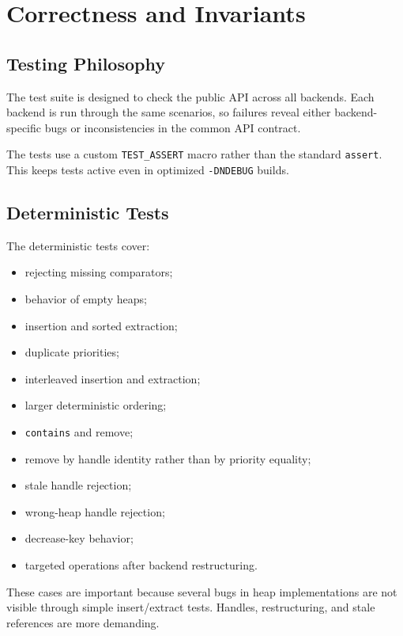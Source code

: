 \chapter{Correctness and Invariants}

\section{Testing Philosophy}

The test suite is designed to check the public API across all backends.
Each backend is run through the same scenarios, so failures reveal either backend-specific bugs or inconsistencies in the common API contract.

The tests use a custom \texttt{TEST\_ASSERT} macro rather than the standard \texttt{assert}.
This keeps tests active even in optimized \texttt{-DNDEBUG} builds.

\section{Deterministic Tests}

The deterministic tests cover:

\begin{itemize}
    \item rejecting missing comparators;
    \item behavior of empty heaps;
    \item insertion and sorted extraction;
    \item duplicate priorities;
    \item interleaved insertion and extraction;
    \item larger deterministic ordering;
    \item \texttt{contains} and remove;
    \item remove by handle identity rather than by priority equality;
    \item stale handle rejection;
    \item wrong-heap handle rejection;
    \item decrease-key behavior;
    \item targeted operations after backend restructuring.
\end{itemize}

These cases are important because several bugs in heap implementations are not visible through simple insert/extract tests.
Handles, restructuring, and stale references are more demanding.

